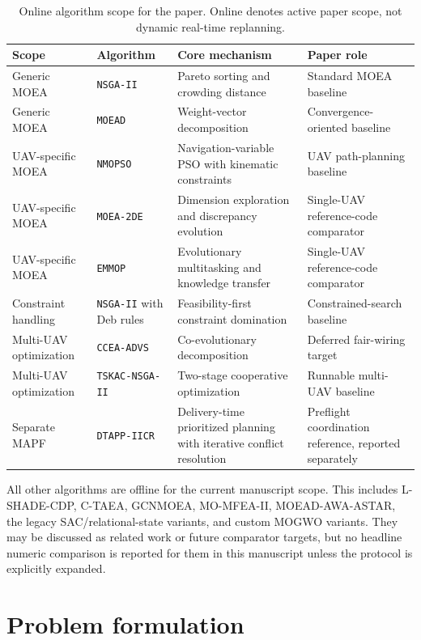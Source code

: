 \documentclass[a4paper,fleqn]{cas-dc}
\begin{document}
\begin{table}[t]
\centering
\scriptsize
\caption{Online algorithm scope for the paper. Online denotes active paper scope, not dynamic real-time replanning.}
\label{tab:baseline-online-scope}
\setlength{\tabcolsep}{3pt}
\begin{tabular*}{\textwidth}{@{\extracolsep{\fill}}p{}p{}p{}p{}}
\toprule
Scope & Algorithm & Core mechanism & Paper role \\
\midrule
Generic MOEA & \texttt{NSGA-II} & Pareto sorting and crowding distance & Standard MOEA baseline \\
Generic MOEA & \texttt{MOEAD} & Weight-vector decomposition & Convergence-oriented baseline \\
UAV-specific MOEA & \texttt{NMOPSO} & Navigation-variable PSO with kinematic constraints & UAV path-planning baseline \\
UAV-specific MOEA & \texttt{MOEA-2DE} & Dimension exploration and discrepancy evolution & Single-UAV reference-code comparator \\
UAV-specific MOEA & \texttt{EMMOP} & Evolutionary multitasking and knowledge transfer & Single-UAV reference-code comparator \\
Constraint handling & \texttt{NSGA-II} with Deb rules & Feasibility-first constraint domination & Constrained-search baseline \\
Multi-UAV optimization & \texttt{CCEA-ADVS} & Co-evolutionary decomposition & Deferred fair-wiring target \\
Multi-UAV optimization & \texttt{TSKAC-NSGA-II} & Two-stage cooperative optimization & Runnable multi-UAV baseline \\
Separate MAPF & \texttt{DTAPP-IICR} & Delivery-time prioritized planning with iterative conflict resolution & Preflight coordination reference, reported separately \\
\bottomrule
\end{tabular*}
\end{table}

All other algorithms are offline for the current manuscript scope. This includes L-SHADE-CDP, C-TAEA, GCNMOEA, MO-MFEA-II, MOEAD-AWA-ASTAR, the legacy SAC/relational-state variants, and custom MOGWO variants. They may be discussed as related work or future comparator targets, but no headline numeric comparison is reported for them in this manuscript unless the protocol is explicitly expanded.

\section{Problem formulation}
\label{sec:problem}
\end{document}
